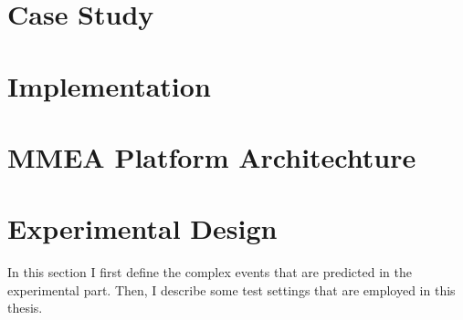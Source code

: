 \section{Case Study}


\section{Implementation}


\section{MMEA Platform Architechture}


\section{Experimental Design}
In this section I first define the complex events that are predicted in the experimental part. Then, I describe some test settings that are employed in this thesis.

